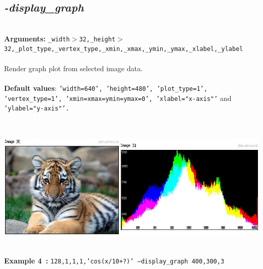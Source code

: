 \documentclass[a4paper,11pt,twoside]{book}
\begin{document}
\subsection{\emph{-display\_graph} }\vspace*{-0.5em}
~\\\textbf{Arguments: } 
{\small \texttt{\_width$>$32,\_height$>$32,\_plot\_type,\_vertex\_type,\_xmin,\_xmax,\_ymin,\_ymax,\_xlabel,\_ylabel}}\\~\\
Render graph plot from selected image data.
~\\~\\\textbf{Default values}: {\small \texttt{'width=640', 'height=480', 'plot\_type=1', 'vertex\_type=1', 'xmin=xmax=ymin=ymax=0', 'xlabel="x-axis"'} and \texttt{'ylabel="y-axis"'.}}
\begin{center}\includegraphics[keepaspectratio=true,height=7cm,width=\textwidth]{img/gmic_def4.jpg}\\
{\footnotesize \textbf{Example 4~:} \texttt{128,1,1,1,'cos(x/10+?)' --display\_graph 400,300,3}}
\end{center}
\end{document}
